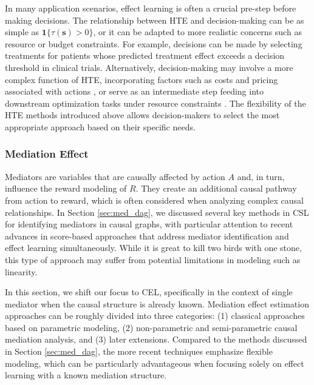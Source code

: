 In many application scenarios, effect learning is often a crucial pre-step before making decisions. The relationship between \acrshort{HTE} and decision-making can be as simple as $\boldsymbol{1}\{\tau(\boldsymbol{s}) > 0\}$, or it can be adapted to more realistic concerns such as resource or budget constraints. For example, decisions can be made by selecting treatments for patients whose predicted treatment effect exceeds a decision threshold \citep{dorresteijn2011estimating} in clinical trials. Alternatively, decision-making may involve a more complex function of \acrshort{HTE}, incorporating factors such as costs and pricing associated with actions \citep{miller2020personalized}, or serve as an intermediate step feeding into downstream optimization tasks under resource constraints \citep{qiu2022individualized}. The flexibility of the \acrshort{HTE} methods introduced above allows decision-makers to select the most appropriate approach based on their specific needs.


\subsubsection{Mediation Effect}\label{sec:sel_med}

Mediators are variables that are causally affected by action $A$ and, in turn, influence the reward modeling of $R$. They create an additional causal pathway from action to reward, which is often considered when analyzing complex causal relationships. In Section \ref{sec:med_dag}, we discussed several key methods in \acrshort{CSL} for identifying mediators in causal graphs, with particular attention to recent advances in score-based approaches \citep{cai2020anoce} that address mediator identification and effect learning simultaneously. While it is great to kill two birds with one stone, this type of approach may suffer from potential limitations in modeling such as linearity. 

In this section, we shift our focus to \acrshort{CEL}, specifically in the context of single mediator when the causal structure is already known. Mediation effect estimation approaches can be roughly divided into three categories: (1) classical approaches based on parametric modeling, (2) non-parametric and semi-parametric causal mediation analysis, and (3) later extensions. Compared to the methods discussed in Section \ref{sec:med_dag}, the more recent techniques emphasize flexible modeling, which can be particularly advantageous when focusing solely on effect learning with a known mediation structure.

